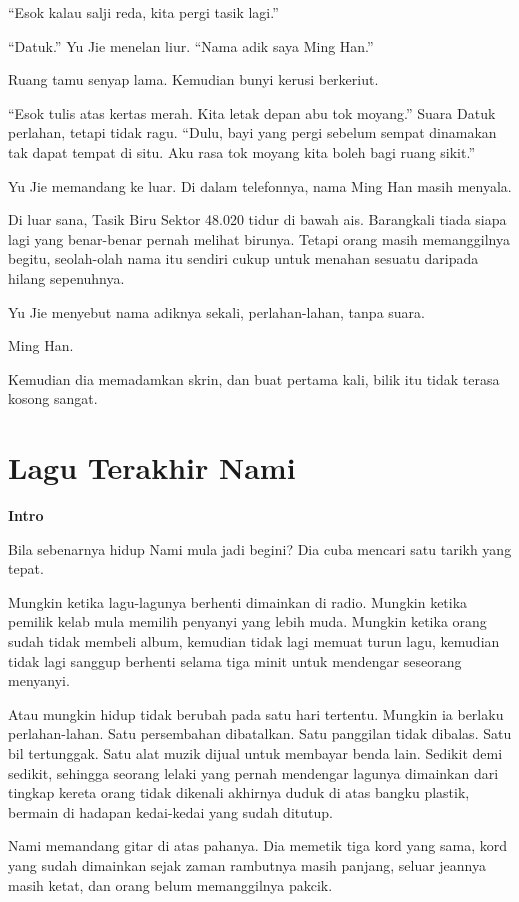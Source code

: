 \documentclass[
  11pt,
  a5paper,
  openany,
  oneside]{book}
\begin{document}
``Esok kalau salji reda, kita pergi tasik lagi.''

``Datuk.'' Yu Jie menelan liur. ``Nama adik saya Ming Han.''

Ruang tamu senyap lama. Kemudian bunyi kerusi berkeriut.

``Esok tulis atas kertas merah. Kita letak depan abu tok moyang.'' Suara
Datuk perlahan, tetapi tidak ragu. ``Dulu, bayi yang pergi sebelum
sempat dinamakan tak dapat tempat di situ. Aku rasa tok moyang kita
boleh bagi ruang sikit.''

Yu Jie memandang ke luar. Di dalam telefonnya, nama Ming Han masih
menyala.

Di luar sana, Tasik Biru Sektor 48.020 tidur di bawah ais. Barangkali
tiada siapa lagi yang benar-benar pernah melihat birunya. Tetapi orang
masih memanggilnya begitu, seolah-olah nama itu sendiri cukup untuk
menahan sesuatu daripada hilang sepenuhnya.

Yu Jie menyebut nama adiknya sekali, perlahan-lahan, tanpa suara.

Ming Han.

Kemudian dia memadamkan skrin, dan buat pertama kali, bilik itu tidak
terasa kosong sangat.

\chapter{Lagu Terakhir Nami}\label{lagu-terakhir-nami}

\textbf{Intro}

Bila sebenarnya hidup Nami mula jadi begini? Dia cuba mencari satu
tarikh yang tepat.

Mungkin ketika lagu-lagunya berhenti dimainkan di radio. Mungkin ketika
pemilik kelab mula memilih penyanyi yang lebih muda. Mungkin ketika
orang sudah tidak membeli album, kemudian tidak lagi memuat turun lagu,
kemudian tidak lagi sanggup berhenti selama tiga minit untuk mendengar
seseorang menyanyi.

Atau mungkin hidup tidak berubah pada satu hari tertentu. Mungkin ia
berlaku perlahan-lahan. Satu persembahan dibatalkan. Satu panggilan
tidak dibalas. Satu bil tertunggak. Satu alat muzik dijual untuk
membayar benda lain. Sedikit demi sedikit, sehingga seorang lelaki yang
pernah mendengar lagunya dimainkan dari tingkap kereta orang tidak
dikenali akhirnya duduk di atas bangku plastik, bermain di hadapan
kedai-kedai yang sudah ditutup.

Nami memandang gitar di atas pahanya. Dia memetik tiga kord yang sama,
kord yang sudah dimainkan sejak zaman rambutnya masih panjang, seluar
jeannya masih ketat, dan orang belum memanggilnya pakcik.
\end{document}
